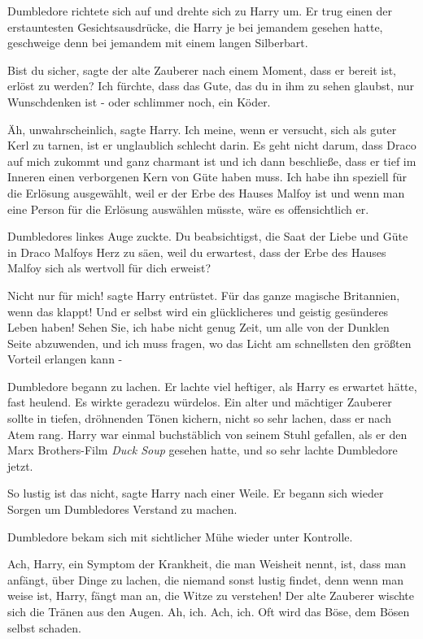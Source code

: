 Dumbledore richtete sich auf und drehte sich zu Harry um. Er trug einen der
erstauntesten Gesichtsausdrücke, die Harry je bei jemandem gesehen hatte,
geschweige denn bei jemandem mit einem langen Silberbart.

\glqq Bist du sicher\grqq{}, sagte der alte Zauberer nach einem Moment, \glqq
dass er bereit ist, erlöst zu werden? Ich fürchte, dass das Gute, das du in ihm
zu sehen glaubst, nur Wunschdenken ist - oder schlimmer noch, ein Köder.\grqq{}

\glqq Äh, unwahrscheinlich\grqq{}, sagte Harry. \glqq Ich meine, wenn er
versucht, sich als guter Kerl zu tarnen, ist er unglaublich schlecht darin. Es
geht nicht darum, dass Draco auf mich zukommt und ganz charmant ist und ich dann
beschließe, dass er tief im Inneren einen verborgenen Kern von Güte haben muss.
Ich habe ihn speziell für die Erlösung ausgewählt, weil er der Erbe des Hauses
Malfoy ist und wenn man eine Person für die Erlösung auswählen müsste, wäre es
offensichtlich er.\grqq{}

Dumbledores linkes Auge zuckte. \glqq Du beabsichtigst, die Saat der Liebe und
Güte in Draco Malfoys Herz zu säen, weil du erwartest, dass der Erbe des Hauses
Malfoy sich als wertvoll für dich erweist?\grqq{}

\glqq Nicht nur für mich!\grqq{} sagte Harry entrüstet. \glqq Für das ganze
magische Britannien, wenn das klappt! Und er selbst wird ein glücklicheres und
geistig gesünderes Leben haben! Sehen Sie, ich habe nicht genug Zeit, um alle
von der Dunklen Seite abzuwenden, und ich muss fragen, wo das Licht am
schnellsten den größten Vorteil erlangen kann -\grqq{}

Dumbledore begann zu lachen. Er lachte viel heftiger, als Harry es erwartet
hätte, fast heulend. Es wirkte geradezu würdelos. Ein alter und mächtiger
Zauberer sollte in tiefen, dröhnenden Tönen kichern, nicht so sehr lachen, dass
er nach Atem rang. Harry war einmal buchstäblich von seinem Stuhl gefallen, als
er den Marx Brothers-Film \emph{Duck Soup }gesehen hatte, und so sehr lachte
Dumbledore jetzt.

\glqq So lustig ist das nicht\grqq{}, sagte Harry nach einer Weile. Er begann
sich wieder Sorgen um Dumbledores Verstand zu machen.

Dumbledore bekam sich mit sichtlicher Mühe wieder unter Kontrolle.

\glqq Ach, Harry, ein Symptom der Krankheit, die man Weisheit nennt, ist, dass
man anfängt, über Dinge zu lachen, die niemand sonst lustig findet, denn wenn
man weise ist, Harry, fängt man an, die Witze zu verstehen!\grqq{} Der alte
Zauberer wischte sich die Tränen aus den Augen. \glqq Ah, ich. Ach, ich. Oft
wird das Böse, dem Bösen selbst schaden.\grqq{}

